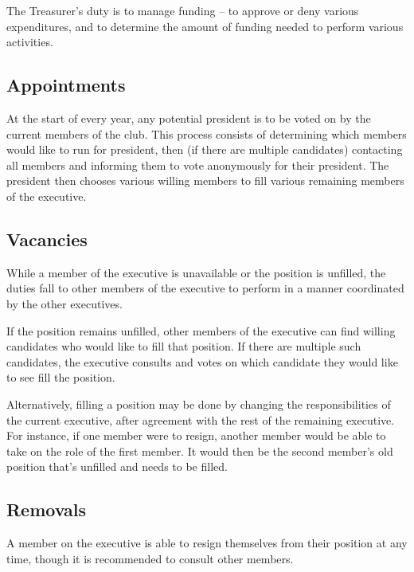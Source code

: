\documentclass[11pt]{article}
\begin{document}
\vspace{2mm}
\noindent
The Treasurer's duty is to manage funding -- to approve or deny various expenditures, and to determine the amount of funding needed to perform various activities.

\subsection{Appointments}

At the start of every year, any potential president is to be voted on by the current members of the club. This process consists of determining which members would like to run for president, then (if there are multiple candidates) contacting all members and informing them to vote anonymously for their president. The president then chooses various willing members to fill various remaining members of the executive.

\subsection{Vacancies}

While a member of the executive is unavailable or the position is unfilled, the duties fall to other members of the executive to perform in a manner coordinated by the other executives.

\vspace{2mm}
\noindent
If the position remains unfilled, other members of the executive can find willing candidates who would like to fill that position. If there are multiple such candidates, the executive consults and votes on which candidate they would like to see fill the position.

\vspace{2mm}
\noindent
Alternatively, filling a position may be done by changing the responsibilities of the current executive, after agreement with the rest of the remaining executive. For instance, if one member were to resign, another member would be able to take on the role of the first member. It would then be the second member's old position that's unfilled and needs to be filled.

\subsection{Removals}

A member on the executive is able to resign themselves from their position at any time, though it is recommended to consult other members.
\end{document}
